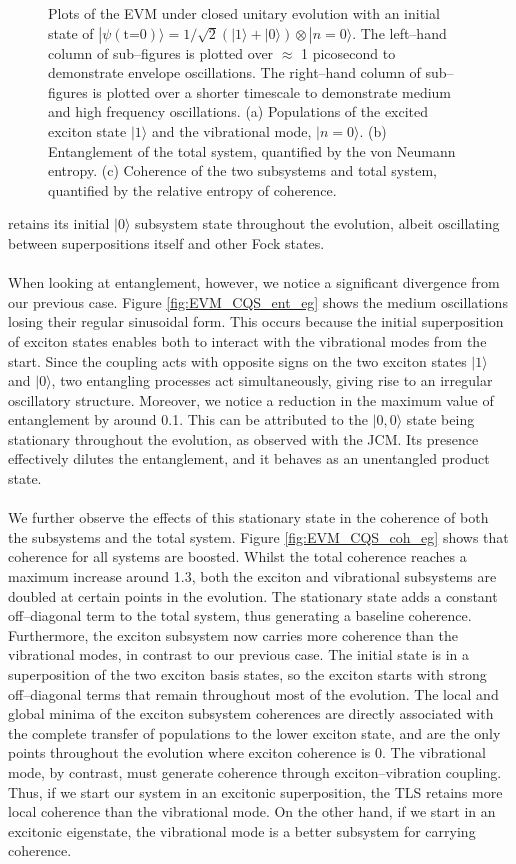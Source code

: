 \documentclass[11pt]{article}
\begin{document}
\begin{figure}[H]
    \caption{Plots of the EVM under closed unitary evolution with an initial state of $|\psi (\text{t=0})\rangle = 1/\sqrt{2}(|1\rangle + |0\rangle)\otimes|n=0\rangle$. The left--hand column of sub--figures is plotted over $\approx$ 1 picosecond to demonstrate envelope oscillations. The right--hand column of sub--figures is plotted over a shorter timescale to demonstrate medium and high frequency oscillations. (a) Populations of the excited exciton state $|1\rangle$ and the vibrational mode, $|n=0\rangle$. (b) Entanglement of the total system, quantified by the von Neumann entropy. (c) Coherence of the two subsystems and total system, quantified by the relative entropy of coherence.} 
    \label{fig:EVM_CQS_eg}
\end{figure}

\noindent retains its initial $|0\rangle$ subsystem state throughout the evolution, albeit oscillating between superpositions itself and other Fock states. \\
\\
When looking at entanglement, however, we notice a significant divergence from our previous case. Figure \ref{fig:EVM_CQS_ent_eg} shows the medium oscillations losing their regular sinusoidal form. This occurs because the initial superposition of exciton states enables both to interact with the vibrational modes from the start. Since the coupling acts with opposite signs on the two exciton states $|1\rangle$ and $|0\rangle$, two entangling processes act simultaneously, giving rise to an irregular oscillatory structure. Moreover, we notice a reduction in the maximum value of entanglement by around 0.1. This can be attributed to the $|0,0\rangle$ state being stationary throughout the evolution, as observed with the JCM. Its presence effectively dilutes the entanglement, and it behaves as an unentangled product state. \\
\\
We further observe the effects of this stationary state in the coherence of both the subsystems and the total system. Figure \ref{fig:EVM_CQS_coh_eg} shows that coherence for all systems are boosted. Whilst the total coherence reaches a maximum increase around 1.3, both the exciton and vibrational subsystems are doubled at certain points in the evolution. The stationary state adds a constant off--diagonal term to the total system, thus generating a baseline coherence. Furthermore, the exciton subsystem now carries more coherence than the vibrational modes, in contrast to our previous case. The initial state is in a superposition of the two exciton basis states, so the exciton starts with strong off--diagonal terms that remain throughout most of the evolution. The local and global minima of the exciton subsystem coherences are directly associated with the complete transfer of populations to the lower exciton state, and are the only points throughout the evolution where exciton coherence is 0. The vibrational mode, by contrast, must generate coherence through exciton--vibration coupling. Thus, if we start our system in an excitonic superposition, the TLS retains more local coherence than the vibrational mode. On the other hand, if we start in an excitonic eigenstate, the vibrational mode is a better subsystem for carrying coherence. 
\end{document}
